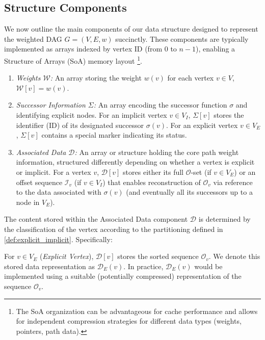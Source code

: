 \subsection{Structure Components}
\label{subsec:structure_components}

We now outline the main components of our data structure designed to represent the weighted DAG $G=(V,E,w)$ succinctly. These components are typically implemented as arrays indexed by vertex ID (from $0$ to $n-1$), enabling a Structure of Arrays (SoA) memory layout \footnote{The SoA organization can be advantageous for cache performance and allows for independent compression strategies for different data types (weights, pointers, path data).}.

\begin{enumerate}
    \item \emph{Weights $\mathcal{W}$:} An array storing the weight $w(v)$ for each vertex $v \in V$, $\mathcal{W}[v] = w(v)$.
    \item \emph{Successor Information $\Sigma$:} An array encoding the successor function $\sigma$ and identifying explicit nodes. For an implicit vertex $v \in V_I$, $\Sigma[v]$ stores the identifier (ID) of its designated successor $\sigma(v)$. For an explicit vertex $v \in V_E$, $\Sigma[v]$ contains a special marker indicating its status.
    \item \emph{Associated Data $\mathcal{D}$:} An array or structure holding the core path weight information, structured differently depending on whether a vertex is explicit or implicit. For a vertex $v$, $\mathcal{D}[v]$ stores either its full $\mathcal{O}$-set (if $v \in V_E$) or an offset sequence $\mathcal{I}_v$ (if $v \in V_I$) that enables reconstruction of $\mathcal{O}_v$ via reference to the data associated with $\sigma(v)$ (and eventually all its successors up to a node in $V_E$).
\end{enumerate}

The content stored within the Associated Data component $\mathcal{D}$ is determined by the classification of the vertex according to the partitioning defined in \ref{def:explicit_implicit}. Specifically:

For $v \in V_E$ (\emph{Explicit Vertex}), $\mathcal{D}[v]$ stores the sorted sequence $\mathcal{O}_v$. We denote this stored data representation as $\mathcal{D}_E(v)$. In practice, $\mathcal{D}_E(v)$ would be implemented using a suitable (potentially compressed) representation of the sequence $\mathcal{O}_v$.

